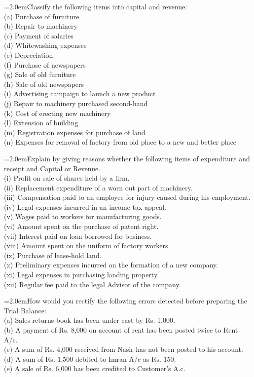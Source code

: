 \documentclass[11pt,a4paper]{article}
\newcommand{\lqn}[2]{\Needspace{6\baselineskip}\par\medskip\noindent\hangindent=2.0em\hangafter=1\makebox[2.0em][l]{\textbf{#1.}}#2\par}
\begin{document}
\lqn{133}{Classify the following items into capital and revenue:\\
(a) Purchase of furniture\\
(b) Repair to machinery\\
(c) Payment of salaries\\
(d) Whitewashing expenses\\
(e) Depreciation\\
(f) Purchase of newspapers\\
(g) Sale of old furniture\\
(h) Sale of old newspapers\\
(i) Advertising campaign to launch a new product\\
(j) Repair to machinery purchased second-hand\\
(k) Cost of erecting new machinery\\
(l) Extension of building\\
(m) Registration expenses for purchase of land\\
(n) Expenses for removal of factory from old place to a new and better place\par
}
\lqn{134}{Explain by giving reasons whether the following items of expenditure and receipt and Capital or Revenue.\\
(i) Profit on sale of shares held by a firm.\\
(ii) Replacement expenditure of a worn out part of machinery.\\
(iii) Compensation paid to an employee for injury caused during his employment.\\
(iv) Legal expenses incurred in an income tax appeal.\\
(v) Wages paid to workers for manufacturing goods.\\
(vi) Amount spent on the purchase of patent right.\\
(vii) Interest paid on loan borrowed for business.\\
(viii) Amount spent on the uniform of factory workers.\\
(ix) Purchase of lease-hold land.\\
(x) Preliminary expenses incurred on the formation of a new company.\\
(xi) Legal expenses in purchasing landing property.\\
(xii) Regular fee paid to the legal Advisor of the company.\par
}
\lqn{135}{How would you rectify the following errors detected before preparing the Trial Balance:\\
(a) Sales returns book has been under-cast by Rs. 1,000.\\
(b) A payment of Rs. 8,000 on account of rent has been posted twice to Rent A/c.\\
(c) A sum of Rs. 4,000 received from Nasir has not been posted to his account.\\
(d) A sum of Rs. 1,500 debited to Imran A/c as Rs. 150.\\
(e) A sale of Rs. 6,000 has been credited to Customer’s A.c.\par
}
\end{document}
